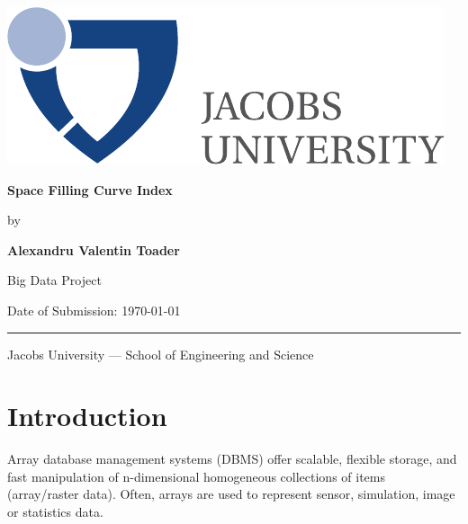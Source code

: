 \documentclass[11pt, a4paper, oneside]{article}
\newcommand{\myname}{Alexandru Valentin Toader}
\newcommand{\mytitle}{Space Filling Curve Index}
\begin{document}

  \thispagestyle{empty}

  \begin{flushright}
   \includegraphics[scale=0.7]{bsc-logo}
  \end{flushright}
  \vspace{20mm}
  \begin{center}
    \huge
    \textbf{\mytitle}
  \end{center}
  \vspace*{4mm}
  \begin{center}
   \Large by
  \end{center}
  \vspace*{4mm}
  \begin{center}
    \Large
    \textbf{\myname}
  \end{center}
  \vspace*{20mm}
  \begin{center}
    \large
    Big Data Project
  \end{center}
  \vfill
  \vspace*{8mm}
  \begin{flushleft}
    \large
    Date of Submission: \today \\
    \rule{\textwidth}{1pt}
  \end{flushleft}
  \begin{center}
    \Large Jacobs University --- School of Engineering and Science
  \end{center}

  \newpage


\newpage
\tableofcontents

\clearpage
{}

\section{Introduction}

Array database management systems (DBMS) offer scalable, flexible storage, and fast manipulation of n-dimensional homogeneous collections of items (array/raster data). Often, arrays are used to represent sensor, simulation, image or statistics data. 
\end{document}
